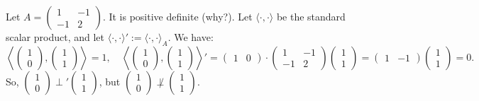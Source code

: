 \begin{example}
    Let $A = \left(\begin{smallmatrix} 1 & -1 \\ -1 & 2 \end{smallmatrix}\right)$. It is positive definite (why?). Let $\langle \cdot, \cdot \rangle$ be the standard scalar product, and let $\langle \cdot, \cdot \rangle' := \langle \cdot, \cdot \rangle_A$.
    We have:
    \[
        \left\langle \begin{pmatrix} 1 \\ 0 \end{pmatrix}, \begin{pmatrix} 1 \\ 1 \end{pmatrix} \right\rangle = 1, \quad \left\langle \begin{pmatrix} 1 \\ 0 \end{pmatrix}, \begin{pmatrix} 1 \\ 1 \end{pmatrix} \right\rangle' = \begin{pmatrix} 1 & 0 \end{pmatrix} \cdot \begin{pmatrix} 1 & -1 \\ -1 & 2 \end{pmatrix} \begin{pmatrix} 1 \\ 1 \end{pmatrix} = \begin{pmatrix} 1 & -1 \end{pmatrix} \begin{pmatrix} 1 \\ 1 \end{pmatrix} = 0.
    \]
    So, $\left(\begin{smallmatrix} 1 \\ 0 \end{smallmatrix}\right) \perp' \left(\begin{smallmatrix} 1 \\ 1 \end{smallmatrix}\right)$, but $\left(\begin{smallmatrix} 1 \\ 0 \end{smallmatrix}\right) \not\perp \left(\begin{smallmatrix} 1 \\ 1 \end{smallmatrix}\right)$.
\end{example}

